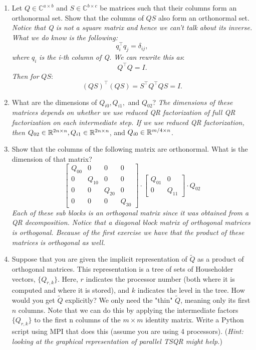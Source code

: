 \documentclass[11pt]{article}
\begin{document}
\begin{enumerate}
    \item Let $Q \in \mathbb{C}^{a \times b}$ and $S \in \mathbb{C}^{b \times c}$ be matrices such that their columns form an orthonormal set. Show that the columns of $QS$ also form an orthonormal set. \\
    \textit{Notice that Q is not a square matrix and hence we can't talk about its inverse. What we do know is the following:}
    \[ q_i^\top q_j = \delta_{ij}, \]
    \textit{where} $q_i$  \textit{is the i-th column of Q. We can rewrite this as}:
    \[ Q^\top Q = I. \]
    \textit{Then for } $QS$:
    \[  (QS)^\top(QS) = S^\top Q^\top QS = I.  \]
    \item What are the dimensions of $Q_{i0}, Q_{i1},$ and $Q_{02}$?
    \textit{The dimensions of these matrices depends on whether we use reduced QR factorization of full QR factorization on each intermediate step. If we use reduced QR factorization, then} $Q_{02} \in \mathbb{R}^{2n \times n}, Q_{i1} \in \mathbb{R}^{2n \times n}$, and $Q_{i0} \in \mathbb{R}^{m/4 \times n}$.
    \item Show that the columns of the following matrix are orthonormal. What is the dimension of that matrix?
    \[ \begin{bmatrix} Q_{00} & 0 & 0 & 0 \\ 0 & Q_{10} & 0 & 0 \\ 0 & 0 & Q_{20} & 0 \\ 0 & 0 & 0 & Q_{30} \end{bmatrix} \cdot \begin{bmatrix} Q_{01} & 0 \\ 0 & Q_{11} \end{bmatrix} \cdot Q_{02}  \]
    \textit{Each of these sub blocks is an orthogonal matrix since it was obtained from a QR decomposition. Notice that a diagonal block matrix of orthogonal matrices is orthogonal. Because of the first exercise we have that the product of these matrices is orthogonal as well.}
    \item Suppose that you are given the implicit representation of $\tilde{Q}$ as a product of orthogonal matrices. This representation is a tree of sets of Householder vectors, $\{Q_{r, k}\}$. Here, $r$ indicates the processor
number (both where it is computed and where it is stored), and
$k$ indicates the level in the tree. How would you get $\tilde{Q}$ explicitly? We only need the "thin" $\tilde{Q}$, meaning only its first $n$ columns. Note that we can do this by applying the intermediate factors $\{Q_{r, k}\}$ to the first n columns of the $m \times m$ identity matrix. Write a Python script using MPI that does this (assume you are using 4 processors). (\textit{Hint: looking at the graphical representation of parallel TSQR might help.})


\end{enumerate}
\end{document}
